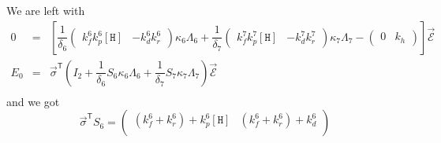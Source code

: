 \documentclass[aps,onecolumn,11pt]{revtex4}
\newcommand{\mychem}[1]{\mathtt{#1}}
\newcommand{\myconc}[1]{\left\lbrack{#1}\right\rbrack}
\newcommand{\Hin}{\myconc{\mychem{H}}}
\newcommand{\mytrn}[1]{{#1}^{\mathsf{T}}}
\begin{document}
We are left with
\begin{equation}
\begin{array}{rcl}
	0 & = & \left\lbrack \dfrac{1}{\delta_6}
	\begin{pmatrix} 
	k_f^6 k_p^6 \Hin &
	-k_d^6 k_r^6
	\end{pmatrix}
	\kappa_6\Lambda_6 
	+ 
	\dfrac{1}{\delta_7}
	\begin{pmatrix} 
	k_f^7 k_p^7 \Hin &
	-k_d^7 k_r^7
	\end{pmatrix}
	\kappa_7\Lambda_7 
	-
	\begin{pmatrix} 
	0 &  k_h
	\end{pmatrix}
	\right\rbrack \vec{\mathcal{E}}
	\\
	E_0 & = & \mytrn{\vec{\sigma}}
	\left(I_2+\dfrac{1}{\delta_6}S_6\kappa_6\Lambda_6 
	+\dfrac{1}{\delta_7}S_7\kappa_7\Lambda_7 \right) \vec{\mathcal{E}}\\
\end{array}
\end{equation}
and we got
\begin{equation}
	\mytrn{\vec{\sigma}} S_6 =
	\begin{pmatrix}
	\left(k_f^6+k_r^6\right) + k_p^6 \Hin & \left(k_f^6+k_r^6\right) + k_d^6\\
	\end{pmatrix}
\end{equation}
\end{document}
